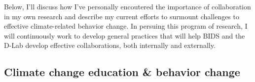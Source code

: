 

\lehead[]{\pagemark}
\rohead[]{\pagemark}

% 



\manualmark
\pagestyle{scrheadings}
\markleft{}




Below, I'll discuss how I've personally encoutered the importance of
collaboration in my own research and describe my current efforts to surmount
challenges to effective climate-related behavior change. In persuing this
program of research, I will continuously work to develop general practices that
will help BIDS and the D-Lab develop effective collaborations, both internally
and externally.

\subsection*{Climate change education \& behavior change}



